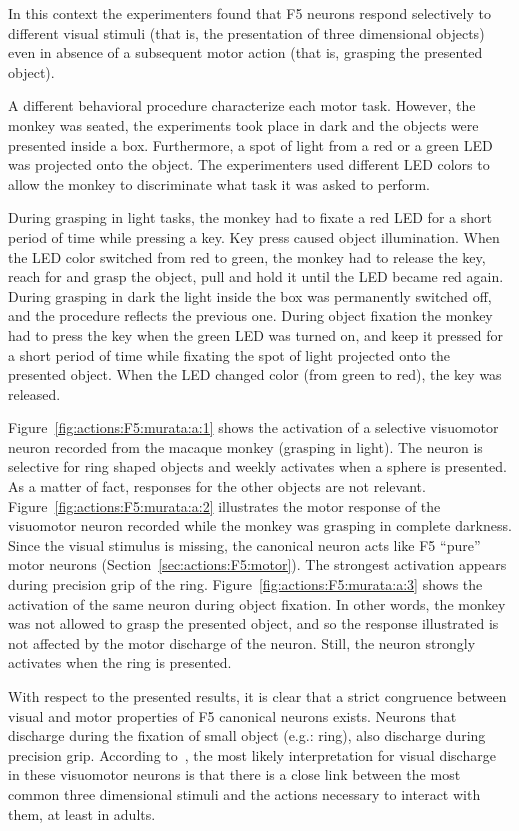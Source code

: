 In this context the experimenters found that F5 neurons respond selectively to
different visual stimuli (that is, the presentation of three dimensional
objects) even in absence of a subsequent motor action (that is, grasping the
presented object).

A different behavioral procedure characterize each motor task. However, the
monkey was seated, the experiments took place in dark and the objects were
presented inside a box.  Furthermore, a spot of light from a red or a green LED
was projected onto the object.
The experimenters used different LED colors to allow the monkey to discriminate
what task it was asked to perform. 

During grasping in light tasks, the monkey had to fixate a red LED for a
short period of time while pressing a key.
Key press caused object illumination. 
When the LED color switched from red to green, the monkey had to release the
key, reach for and grasp the object, pull and hold it until the LED became 
red again.
During grasping in dark the light inside the box was permanently switched
off, and the procedure reflects the previous one.
During object fixation the monkey had to press the key when the green LED was 
turned on, and keep it pressed for a short period of time while fixating the
spot of light projected onto the presented object.
When the LED changed color (from green to red), the key was released.


Figure~\ref{fig:actions:F5:murata:a:1} shows the activation of a selective
visuomotor neuron recorded from the macaque monkey (grasping in light).
The neuron is selective for ring shaped objects and weekly activates when a
sphere is presented. 
As a matter of fact, responses for the other objects are not relevant.
Figure~\ref{fig:actions:F5:murata:a:2} illustrates the motor response of the
visuomotor neuron recorded while the monkey was grasping in complete darkness. 
Since the visual stimulus is missing, the canonical neuron acts like
F5  ``pure'' motor neurons (Section~\ref{sec:actions:F5:motor}).
The strongest activation appears during precision grip of the ring.
Figure~\ref{fig:actions:F5:murata:a:3} shows the activation of the same neuron
during object fixation. In other words, the monkey was not allowed to grasp the
presented object, and so the response illustrated is not affected by
the motor discharge of the neuron.
Still, the neuron strongly activates when the ring is presented.


With respect to the presented results, it is clear that a strict congruence
between visual and motor properties of F5 canonical neurons exists.
Neurons that discharge during the fixation of small object (e.g.: ring), also
discharge during precision grip. 
According to~\citet{fadiga.etal:PRESS}, the most likely interpretation for
visual discharge in these visuomotor neurons is that there is a close link 
between the most common three dimensional stimuli and the actions necessary to
interact with them, at least in adults.

